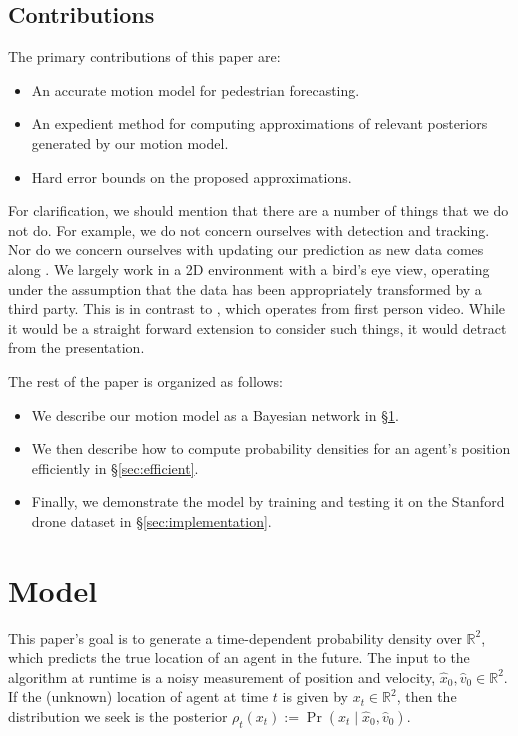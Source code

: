 \documentclass[letterpaper,10pt,conference]{ieeeconf}
\begin{document}
\subsection{Contributions}

The primary contributions of this paper are:
\begin{itemize}
	\item An accurate motion model for pedestrian forecasting.
	\item An expedient method for computing approximations of relevant posteriors generated by our motion model.
	\item Hard error bounds on the proposed approximations.
\end{itemize}

For clarification, we should mention that there are a number of things that we do not do.
For example, we do not concern ourselves with detection and tracking. 
Nor do we concern ourselves with updating our prediction as new data comes along \cite{Kitani2012}.
We largely work in a 2D environment with a bird's eye view, operating under the assumption that the data has been appropriately transformed by a third party.
This is in contrast to \cite{Karasev2016}, which operates from first person video.
While it would be a straight forward extension to consider such things, it would detract from the presentation.

The rest of the paper is organized as follows:
\begin{itemize}
	\item We describe our motion model as a Bayesian network  in \S \ref{sec:model}.
	\item We then describe how to compute probability densities for an agent's position efficiently  in \S \ref{sec:efficient}.
	\item Finally, we demonstrate the model by training and testing it on the Stanford drone dataset \cite{Robicquet2016} in \S \ref{sec:implementation}.
\end{itemize}

\section{Model}\label{sec:model}
This paper's goal is to generate a time-dependent probability density over $\mathbb{R}^2$, which predicts the true location of an agent in the future.
The input to the algorithm at runtime is a noisy measurement of position and velocity, $\hat{x}_0, \hat{v}_0 \in \mathbb{R}^2$.
If the (unknown) location of agent at time $t$ is given by $x_t \in \mathbb{R}^2$, then the distribution we seek is the posterior $\rho_t(x_t) := \Pr( x_t \mid \hat{x}_0, \hat{v}_0 )$.
\end{document}

